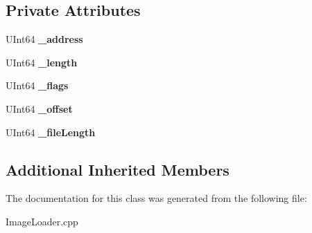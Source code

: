 \subsection*{Private Attributes}
\begin{DoxyCompactItemize}
\item 
\mbox{\label{class_image_loader___segment_ad83f34ab7ab6b0f073ddb3baa4f71b12}} 
U\+Int64 {\bfseries \+\_\+address}
\item 
\mbox{\label{class_image_loader___segment_ace3b34c70ea09cd1f9fc26e5b8be0d3e}} 
U\+Int64 {\bfseries \+\_\+length}
\item 
\mbox{\label{class_image_loader___segment_a8a2bcb0fff7a42aa0840c1bc94a79ef2}} 
U\+Int64 {\bfseries \+\_\+flags}
\item 
\mbox{\label{class_image_loader___segment_a9517242b943c0f8cbba9e18a9fd663db}} 
U\+Int64 {\bfseries \+\_\+offset}
\item 
\mbox{\label{class_image_loader___segment_a2b6f1b875ed8be014038d1fec95c83a2}} 
U\+Int64 {\bfseries \+\_\+file\+Length}
\end{DoxyCompactItemize}
\subsection*{Additional Inherited Members}


The documentation for this class was generated from the following file\+:\begin{DoxyCompactItemize}
\item 
Image\+Loader.\+cpp\end{DoxyCompactItemize}
